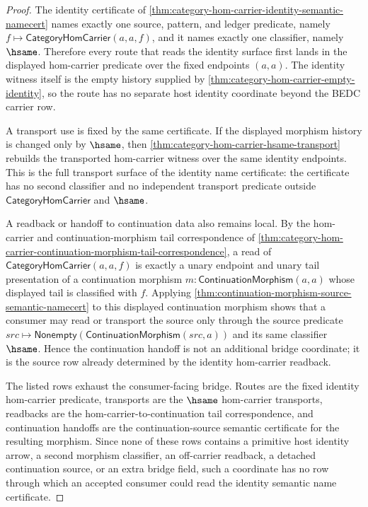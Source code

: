\begin{proof}
The identity certificate of
\autoref{thm:category-hom-carrier-identity-semantic-namecert} names exactly one
source, pattern, and ledger predicate, namely
$f\mapsto\mathsf{CategoryHomCarrier}(a,a,f)$, and it names exactly one
classifier, namely $\hsame$. Therefore every route that reads the identity
surface first lands in the displayed hom-carrier predicate over the fixed
endpoints $(a,a)$. The identity witness itself is the empty history supplied by
\autoref{thm:category-hom-carrier-empty-identity}, so the route has no separate
host identity coordinate beyond the BEDC carrier row.

A transport use is fixed by the same certificate. If the displayed morphism
history is changed only by $\hsame$, then
\autoref{thm:category-hom-carrier-hsame-transport} rebuilds the transported
hom-carrier witness over the same identity endpoints. This is the full
transport surface of the identity name certificate: the certificate has no
second classifier and no independent transport predicate outside
$\mathsf{CategoryHomCarrier}$ and $\hsame$.

A readback or handoff to continuation data also remains local. By the
hom-carrier and continuation-morphism tail correspondence of
\autoref{thm:category-hom-carrier-continuation-morphism-tail-correspondence}, a
read of $\mathsf{CategoryHomCarrier}(a,a,f)$ is exactly a unary endpoint and
unary tail presentation of a continuation morphism $m:\mathsf{ContinuationMorphism}(a,a)$
whose displayed tail is classified with $f$. Applying
\autoref{thm:continuation-morphism-source-semantic-namecert} to this displayed
continuation morphism shows that a consumer may read or transport the source
only through the source predicate
$src\mapsto\mathsf{Nonempty}(\mathsf{ContinuationMorphism}(src,a))$ and its
same classifier $\hsame$. Hence the continuation handoff is not an additional
bridge coordinate; it is the source row already determined by the identity
hom-carrier readback.

The listed rows exhaust the consumer-facing bridge. Routes are the fixed
identity hom-carrier predicate, transports are the $\hsame$ hom-carrier
transports, readbacks are the hom-carrier-to-continuation tail correspondence,
and continuation handoffs are the continuation-source semantic certificate for
the resulting morphism. Since none of these rows contains a primitive host
identity arrow, a second morphism classifier, an off-carrier readback, a
detached continuation source, or an extra bridge field, such a coordinate has no
row through which an accepted consumer could read the identity semantic name
certificate.
\end{proof}

